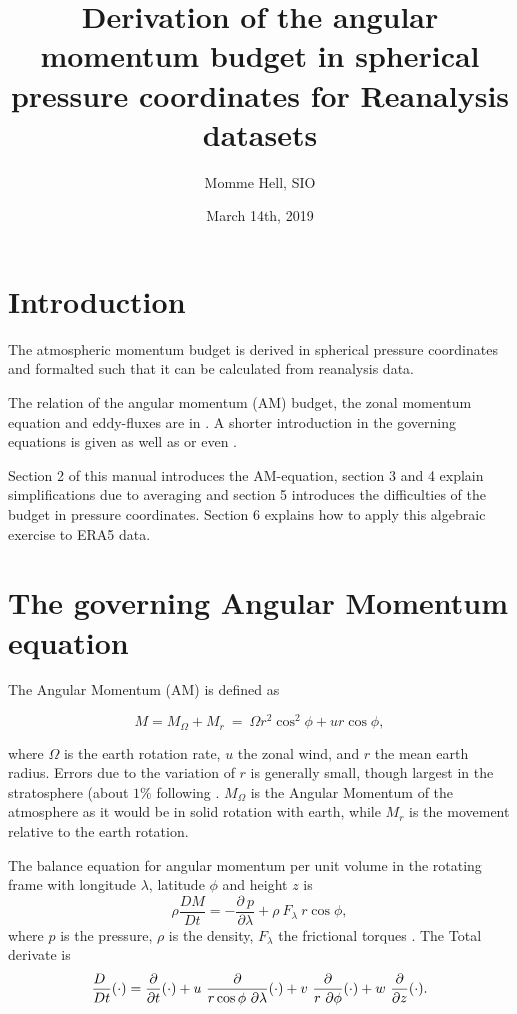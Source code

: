 \documentclass[11pt]{article}
\title{Derivation of the angular momentum budget in spherical pressure coordinates for Reanalysis datasets}
\author{Momme Hell, SIO}
\date{March 14th, 2019}      %
\numberwithin{equation}{section}
\newcommand{\beq}{\begin{equation}}
\newcommand{\eeq}{\end{equation}}
\newcommand{\Dt}[1]{\frac{D#1}{D t}}
\newcommand{\cphi}{\cos \phi}
\begin{document}
\maketitle

\section{Introduction}
The atmospheric momentum budget is derived in spherical pressure coordinates and formalted  such that it can be calculated from reanalysis data.\par

The relation of the angular momentum (AM) budget, the zonal momentum equation and eddy-fluxes are in \citet[chapter 11,][]{Peixoto2008}. A shorter introduction in the governing equations is given \citet[chapter 4.12, and 13.10,][]{Gill1982} as well as \citet{Andrews1987} or even \citet{Holton1975}.\par

Section 2 of this manual introduces the AM-equation, section 3 and 4 explain simplifications due to averaging and section 5 introduces the difficulties of the budget in pressure coordinates. Section 6 explains how to apply this algebraic exercise to ERA5 data. 

\section{The governing Angular Momentum equation}
The Angular Momentum (AM) is defined as 

\beq
M = M_\Omega + M_r ~=~ \Omega r^2 \cos^2 \phi + u r\cos \phi, 
\eeq

where $\Omega$ is the earth rotation rate, $u$ the zonal wind, and $r$ the mean earth radius. Errors due to the variation of $r$ is generally small, though largest in the stratosphere (about $1\%$ following \citet[][chapter 4.12, p.93]{Gill1982}. $M_\Omega$ is the Angular Momentum of the atmosphere as it would be in solid rotation with earth, while $M_r$ is the movement relative to the earth rotation.\par

The balance equation for angular momentum per unit volume in the rotating frame with longitude $\lambda$, latitude $\phi$ and height $z$ is  
\beq
\rho \Dt M = - \frac{\partial~p}{\partial \lambda} + \rho~F_\lambda~ r \cphi, 
\eeq
where $p$ is the pressure, $\rho$ is the density, $F_\lambda$ the frictional torques \citep[eq. 11.4,][]{Peixoto2008}. The Total derivate is 
\beq
\Dt~(\cdot) = \frac{\partial}{\partial t} (\cdot) + u~ \frac{\partial}{r \cphi ~\partial \lambda}  (\cdot) + v~ \frac{\partial}{r~ \partial \phi} (\cdot) + w ~ \frac{\partial}{\partial z}  (\cdot).
\eeq
\end{document}
